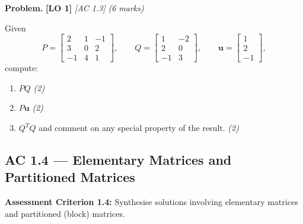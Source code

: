 \documentclass[12pt,a4paper]{article}
\newcommand{\lo}[1]{\textcolor{locolor}{\textbf{[LO #1]}}}
\newcommand{\ac}[1]{\textcolor{locolor}{\textit{[AC #1]}}}
\newcommand{\mat}[1]{\begin{bmatrix}#1\end{bmatrix}}
\begin{document}
	\begin{tcolorbox}[practice]
		\textbf{Problem.} \lo{1} \ac{1.3} \hfill \textit{(6 marks)}
		
		Given
		\[
		P = \mat{2 & 1 & -1 \\ 3 & 0 & 2 \\ -1 & 4 & 1},\qquad
		Q = \mat{1 & -2 \\ 2 & 0 \\ -1 & 3},\qquad
		\mathbf{u} = \mat{1 \\ 2 \\ -1},
		\]
		compute:
		\begin{enumerate}[label=(\alph*)]
			\item $PQ$ \hfill\textit{(2)}
			\item $P\mathbf{u}$ \hfill\textit{(2)}
			\item $Q^T Q$ and comment on any special property of the result. \hfill\textit{(2)}
		\end{enumerate}
	\end{tcolorbox}
	
	\begin{tcolorbox}[answer]
	\end{tcolorbox}
	
	\newpage
	
	\subsection{AC 1.4 — Elementary Matrices and Partitioned Matrices}
	
	\begin{tcolorbox}[subtopic]
		\textbf{Assessment Criterion 1.4:} Synthesise solutions involving elementary matrices and
		partitioned (block) matrices.
	\end{tcolorbox}
	
\end{document}
